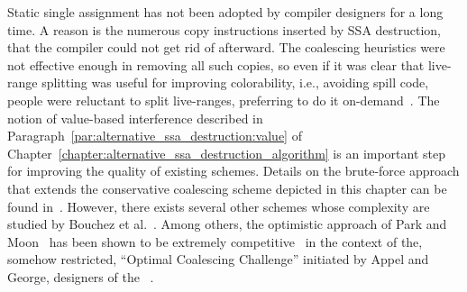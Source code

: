 {%
Static single assignment has not been adopted by compiler designers for a long time.
A reason is the numerous copy instructions inserted by SSA destruction, that the compiler could not get rid of afterward.
The coalescing heuristics were not effective enough in removing all such copies, so even if it was clear that live-range splitting was useful for improving colorability, i.e., avoiding spill code, people were reluctant to split live-ranges, preferring to do it on-demand~\cite{cooper1998live}.
The notion of value-based interference described in Paragraph~\ref{par:alternative_ssa_destruction:value} of Chapter~\ref{chapter:alternative_ssa_destruction_algorithm} is an important step for improving the quality of existing schemes.
Details on the brute-force approach that extends the conservative coalescing scheme depicted in this chapter can be found in~\cite{todo}.
However, there exists several other schemes whose complexity are studied by Bouchez et al.~\cite{BouchezDR07:coalescing-cplx}.
Among others, the optimistic approach of Park and Moon~\cite{park2004optimistic} has been shown to be extremely competitive~\cite{Grund07,Bouchez:case08} in the context of the, somehow restricted, ``Optimal Coalescing Challenge'' initiated by Appel and George, designers of the \irc~\cite{george:96:iterated}.
}


